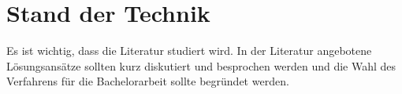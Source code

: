 
\newpage
\chapter{Stand der Technik}

Es ist wichtig, dass die Literatur studiert wird. In der Literatur angebotene Lösungsansätze sollten kurz diskutiert und besprochen werden und die Wahl des Verfahrens für die Bachelorarbeit sollte begründet werden.
\newpage

